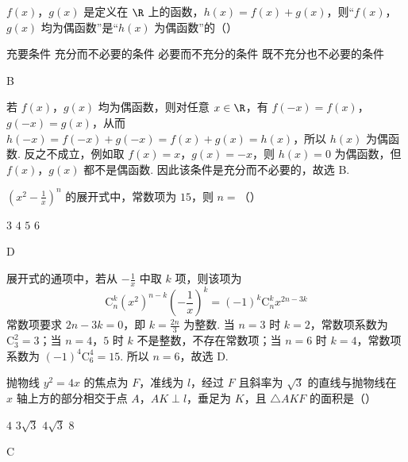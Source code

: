 \begin{problem}
\(f(x)\)，\(g(x)\) 是定义在 \(\R\) 上的函数，\(h(x) = f(x) + g(x)\)，则“\(f(x)\)，\(g(x)\) 均为偶函数”是“\(h(x)\) 为偶函数”的（\quad）

\choices
    {充要条件}
    {充分而不必要的条件}
    {必要而不充分的条件}
    {既不充分也不必要的条件}
\end{problem}

\begin{answer}
B
\end{answer}

\begin{solution}
若 \(f(x)\)，\(g(x)\) 均为偶函数，则对任意 \(x\in\R\)，有 \(f(-x)=f(x)\)，\(g(-x)=g(x)\)，从而 \(h(-x)=f(-x)+g(-x)=f(x)+g(x)=h(x)\)，所以 \(h(x)\) 为偶函数. 反之不成立，例如取 \(f(x)=x\)，\(g(x)=-x\)，则 \(h(x)=0\) 为偶函数，但 \(f(x)\)，\(g(x)\) 都不是偶函数. 因此该条件是充分而不必要的，故选 B.
\end{solution}

\begin{problem}
\(\left(x^{2} - \frac{1}{x}\right)^n\) 的展开式中，常数项为 \(15\)，则 \(n =\)（\quad）

\choices
    {\(3\)}
    {\(4\)}
    {\(5\)}
    {\(6\)}
\end{problem}

\begin{answer}
D
\end{answer}

\begin{solution}
展开式的通项中，若从 \(-\frac1x\) 中取 \(k\) 项，则该项为
\[
\mathrm C_n^k(x^2)^{n-k}\left(-\frac1x\right)^k=(-1)^k\mathrm C_n^k x^{2n-3k}
\]
常数项要求 \(2n-3k=0\)，即 \(k=\frac{2n}{3}\) 为整数. 当 \(n=3\) 时 \(k=2\)，常数项系数为 \(\mathrm C_3^2=3\)；当 \(n=4\)，\(5\) 时 \(k\) 不是整数，不存在常数项；当 \(n=6\) 时 \(k=4\)，常数项系数为 \((-1)^4\mathrm C_6^4=15\). 所以 \(n=6\)，故选 D.
\end{solution}

\begin{problem}
抛物线 \(y^{2}=4x\) 的焦点为 \(F\)，准线为 \(l\)，经过 \(F\) 且斜率为 \(\sqrt{3}\) 的直线与抛物线在 \(x\) 轴上方的部分相交于点 \(A\)，\(AK \perp l\)，垂足为 \(K\)，且 \(\triangle AKF\) 的面积是（\quad）

\choices
    {\(4\)}
    {\(3\sqrt{3}\)}
    {\(4\sqrt{3}\)}
    {\(8\)}
\end{problem}

\begin{answer}
C
\end{answer}

